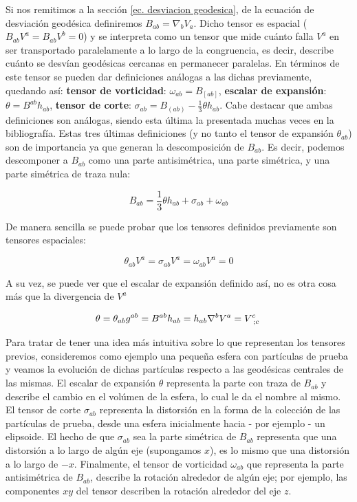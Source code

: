 Si nos remitimos a la sección \ref{ec. desviacion geodesica}, de la ecuación de desviación geodésica definiremos $B_{ab}=\nabla_bV_a$. Dicho tensor es espacial ($B_{ab}V^a=B_{ab}V^b=0$) y se interpreta como un tensor que mide cuánto falla $V^a$ en ser transportado paralelamente a lo largo de la congruencia, es decir, describe cuánto se desvían geodésicas cercanas en permanecer paralelas. En términos de este tensor se pueden dar definiciones análogas a las dichas previamente, quedando así: \textbf{tensor de vorticidad}: $\omega_{ab}=B_{[ab]}$, \textbf{escalar de expansión}: $\theta=B^{ab}h_{ab}$, \textbf{tensor de corte}: $\sigma_{ab}=B_{(ab)}-\frac{1}{3}\theta h_{ab}$. Cabe destacar que ambas definiciones son análogas, siendo esta última la presentada muchas veces en la bibliografía. Estas tres últimas definiciones (y no tanto el tensor de expansión $\theta_{ab}$) son de importancia ya que generan la descomposición de $B_{ab}$. Es decir, podemos descomponer a $B_{ab}$ como una parte antisimétrica, una parte simétrica, y una parte simétrica de traza nula:

\[B_{ab}=\frac{1}{3}\theta h_{ab}+\sigma_{ab}+\omega_{ab} \]

De manera sencilla se puede probar que los tensores definidos previamente son tensores espaciales: 

\[ \theta_{ab}V^a=\sigma_{ab}V^a=\omega_{ab}V^a=0 \]

A su vez, se puede ver que el escalar de expansión definido así, no es otra cosa más que la divergencia de $V^a$

\[\theta=\theta_{ab}g^{ab}=B^{ab}h_{ab}=h_{ab}\nabla^bV^a=\tensor{V}{^c_{;c}} \]

Para tratar de tener una idea más intuitiva sobre lo que representan los tensores previos, consideremos como ejemplo una pequeña esfera con partículas de prueba y veamos la evolución de dichas partículas respecto a las geodésicas centrales de las mismas. El escalar de expansión $\theta$ representa la parte con traza de $B_{ab}$ y describe el cambio en el volúmen de la esfera, lo cual le da el nombre al mismo. El tensor de corte $\sigma_{ab}$ representa la distorsión en la forma de la colección de las partículas de prueba, desde una esfera inicialmente hacia - por ejemplo - un elipsoide. El hecho de que $\sigma_{ab}$ sea la parte simétrica de $B_{ab}$ representa que una distorsión a lo largo de algún eje (supongamos $x$), es lo mismo que una distorsión a lo largo de $-x$. Finalmente, el tensor de vorticidad $\omega_{ab}$ que representa la parte antisimétrica de $B_{ab}$, describe la rotación alrededor de algún eje; por ejemplo, las componentes $xy$ del tensor describen la rotación alrededor del eje $z$. 

